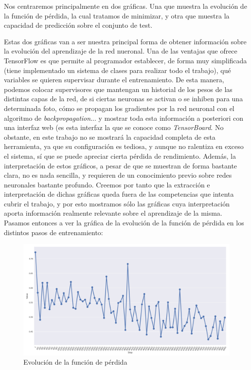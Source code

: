 \documentclass[11pt]{article}
\theoremstyle{plain}
\theoremstyle{definition}
\begin{document}
Nos centraremos principalmente en dos gráficas. Una que muestra la
evolución de la función de pérdida, la cual tratamos de minimizar, y
otra que muestra la capacidad de predicción sobre el conjunto de test.

Estas dos gráficas van a ser nuestra principal forma de obtener
información sobre la evolución del aprendizaje de la red nueronal. Una
de las ventajas que ofrece TensorFlow es que permite al programador
establecer, de forma muy simplificada (tiene implementado un sistema
de clases para realizar todo el trabajo), qué variables se quieren
supervisar durante el entrenamiento. De esta manera, podemos colocar
supervisores que mantengan un historial de los pesos de las distintas
capas de la red, de si ciertas neuronas se activan o se inhiben para
una determinada foto, cómo se propagan los gradientes por la red
neuronal con el algoritmo de \textit{backpropagation}... y mostrar
toda esta información a posteriori con una interfaz web (es esta
interfaz la que se conoce como \textit{TensorBoard}. No obstante, en
este trabajo no se mostrará la capacidad completa de esta herramienta,
ya que su configuración es tediosa, y aunque no ralentiza en exceso el
sistema, sí que se puede apreciar cierta pérdida de
rendimiento. Además, la interpretación de estos gráficos, a pesar de
que se muestran de forma bastante clara, no es nada sencilla, y
requieren de un conocimiento previo sobre redes neuronales bastante
profundo. Creemos por tanto que la extracción e interpretación de
dichas gráficas queda fuera de las competencias que intenta cubrir el
trabajo, y por esto mostramos sólo las gráficas cuya interpretación
aporta información realmente relevante sobre el aprendizaje de la
misma.\\

Pasamos entonces a ver la gráfica de la evolución de la función de
pérdida en los distintos pasos de entrenamiento:

\begin{figure}[H]
  \centering \includegraphics[width=.95\textwidth]{imgs/loss_base}
  \caption{Evolución de la función de pérdida}
\end{figure}
\end{document}
